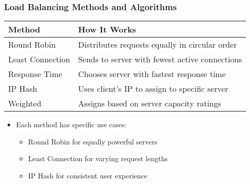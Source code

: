 \documentclass{beamer}
\begin{document}
\begin{frame}
    \frametitle{Load Balancing Methods and Algorithms}
    
    \begin{tabular}{|p{}|p{}|}
        \hline
        \textbf{Method} & \textbf{How It Works} \\
        \hline
        Round Robin & Distributes requests equally in circular order \\
        \hline
        Least Connection & Sends to server with fewest active connections \\
        \hline
        Response Time & Chooses server with fastest response time \\
        \hline
        IP Hash & Uses client's IP to assign to specific server \\
        \hline
        Weighted & Assigns based on server capacity ratings \\
        \hline
    \end{tabular}
    
    \begin{itemize}
        \item Each method has specific use cases:
        \begin{itemize}
            \item Round Robin for equally powerful servers
            \item Least Connection for varying request lengths
            \item IP Hash for consistent user experience
        \end{itemize}
    \end{itemize}
\end{frame}
\end{document}
